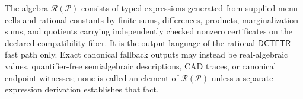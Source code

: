 The algebra \(\mathscr R(\mathcal P)\) consists of typed expressions generated from supplied menu cells and rational constants by finite sums, differences, products, marginalization sums, and quotients carrying independently checked nonzero certificates on the declared compatibility fiber.  It is the output language of the rational \(\mathsf{DCTFTR}\) fast path only.  Exact canonical fallback outputs may instead be real-algebraic values, quantifier-free semialgebraic descriptions, CAD traces, or canonical endpoint witnesses; none is called an element of \(\mathscr R(\mathcal P)\) unless a separate expression derivation establishes that fact.